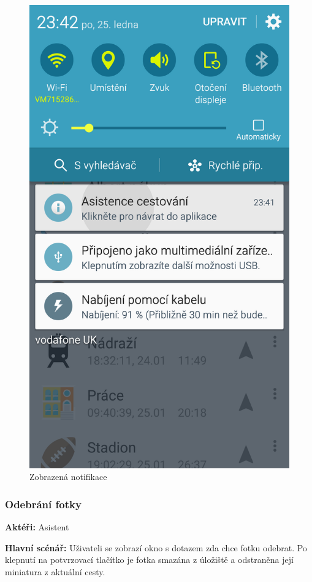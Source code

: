 \documentclass{article}
\newcommand{\usecase}[2]{\subsubsection{#1}\label{#2}}
\begin{document}
\begin{figure}[H]
\begin{minipage}{.5\textwidth}
                \includegraphics[scale=0.14]{img/screen/notifikace.png}
        \caption{Zobrazená notifikace}
        \label{fig:notifikacenahravanicesty}

       \end{minipage}
\end{figure}


\usecase{Odebrání fotky}{odebranifotky}
\textbf{Aktéři:} Asistent

\vspace{0.1cm}
\noindent
\textbf{Hlavní scénář:} Uživateli se zobrazí okno s dotazem zda chce fotku odebrat. Po klepnutí na
potvrzovací tlačítko je fotka smazána z úložiště a odstraněna její miniatura z aktuální cesty.
\end{document}
